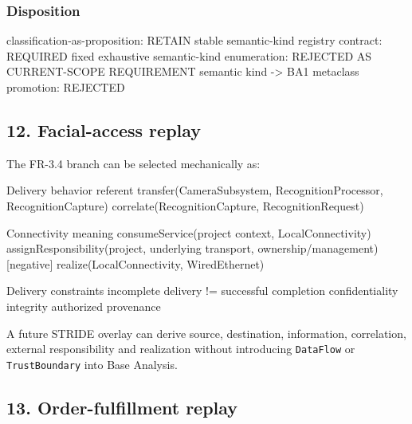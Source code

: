 \documentclass[
  10pt,
  a4paper,
]{article}
\newenvironment{Shaded}{}{}
\newcommand{\NormalTok}[1]{#1}
\begin{document}
\subsubsection{Disposition}\label{disposition-2}

\begin{Shaded}
\begin{Highlighting}[]
\NormalTok{classification{-}as{-}proposition: RETAIN}
\NormalTok{stable semantic{-}kind registry contract: REQUIRED}
\NormalTok{fixed exhaustive semantic{-}kind enumeration: REJECTED AS CURRENT{-}SCOPE REQUIREMENT}
\NormalTok{semantic kind {-}\textgreater{} BA1 metaclass promotion: REJECTED}
\end{Highlighting}
\end{Shaded}

\subsection{12. Facial-access replay}\label{12-facial-access-replay}

The FR-3.4 branch can be selected mechanically as:

\begin{Shaded}
\begin{Highlighting}[]
\NormalTok{Delivery behavior referent}
\NormalTok{  transfer(CameraSubsystem, RecognitionProcessor, RecognitionCapture)}
\NormalTok{  correlate(RecognitionCapture, RecognitionRequest)}

\NormalTok{Connectivity meaning}
\NormalTok{  consumeService(project context, LocalConnectivity)}
\NormalTok{  assignResponsibility(project, underlying transport, ownership/management) [negative]}
\NormalTok{  realize(LocalConnectivity, WiredEthernet)}

\NormalTok{Delivery constraints}
\NormalTok{  incomplete delivery != successful completion}
\NormalTok{  confidentiality}
\NormalTok{  integrity}
\NormalTok{  authorized provenance}
\end{Highlighting}
\end{Shaded}

A future STRIDE overlay can derive source, destination, information,
correlation, external responsibility and realization without introducing
\texttt{DataFlow} or \texttt{TrustBoundary} into Base Analysis.

\subsection{13. Order-fulfillment
replay}\label{13-order-fulfillment-replay}
\end{document}
